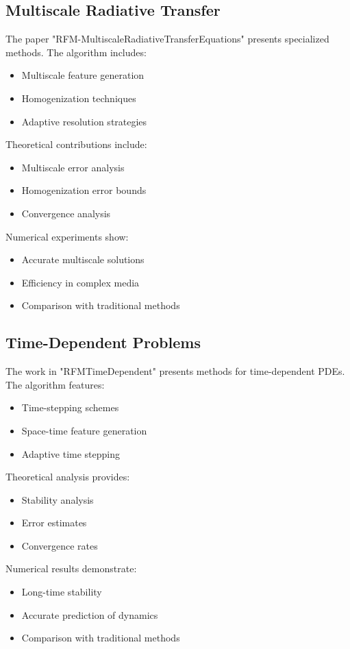 \documentclass[12pt]{article}
\begin{document}
\subsection{Multiscale Radiative Transfer}
\label{subsec:rfm_radiative}
The paper "RFM-MultiscaleRadiativeTransferEquations" presents specialized methods. The algorithm includes:
\begin{itemize}
    \item Multiscale feature generation
    \item Homogenization techniques
    \item Adaptive resolution strategies
\end{itemize}
Theoretical contributions include:
\begin{itemize}
    \item Multiscale error analysis
    \item Homogenization error bounds
    \item Convergence analysis
\end{itemize}
Numerical experiments show:
\begin{itemize}
    \item Accurate multiscale solutions
    \item Efficiency in complex media
    \item Comparison with traditional methods
\end{itemize}

\subsection{Time-Dependent Problems}
\label{subsec:rfm_time}
The work in "RFMTimeDependent" presents methods for time-dependent PDEs. The algorithm features:
\begin{itemize}
    \item Time-stepping schemes
    \item Space-time feature generation
    \item Adaptive time stepping
\end{itemize}
Theoretical analysis provides:
\begin{itemize}
    \item Stability analysis
    \item Error estimates
    \item Convergence rates
\end{itemize}
Numerical results demonstrate:
\begin{itemize}
    \item Long-time stability
    \item Accurate prediction of dynamics
    \item Comparison with traditional methods
\end{itemize}
\end{document}
